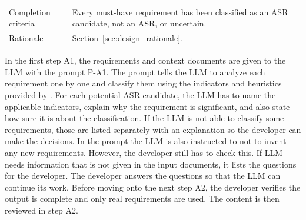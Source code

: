 \begin{table}[!htbp]
\begin{tabularx}{\textwidth}{l X}
		Completion criteria & Every must-have requirement has been classified as an ASR candidate, not an ASR, or uncertain.                                                                                                                                                                                                                                     \\
		Rationale           & Section~\ref{sec:design_rationale}.                                                                                                                                                                                                                                                                                                \\
		\bottomrule
	\end{tabularx}
\end{table}

In the first step A1, the requirements and context documents are given to the LLM with the prompt P-A1. The prompt tells the LLM to analyze each requirement one by one and classify them using the indicators and heuristics provided by \textcite{chenCharacterizingArchitecturallySignificant2013}. For each potential ASR candidate, the LLM has to name the applicable indicators, explain why the requirement is significant, and also state how sure it is about the classification. If the LLM is not able to classify some requirements, those are listed separately with an explanation so the developer can make the decisions. In the prompt the LLM is also instructed to not to invent any new requirements. However, the developer still has to check this. If LLM needs information that is not given in the input documents, it lists the questions for the developer. The developer answers the questions so that the LLM can continue its work. Before moving onto the next step A2, the developer verifies the output is complete and only real requirements are used. The content is then reviewed in step A2.

